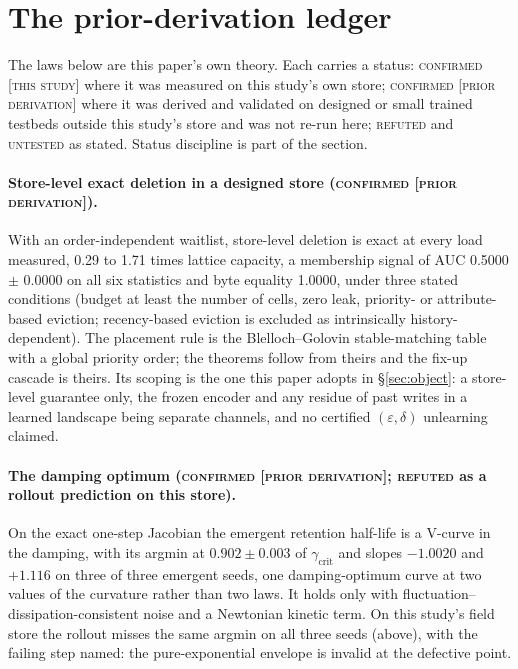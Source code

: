 \documentclass{article}
\begin{document}
\section{The prior-derivation ledger}
\label{app:shorts}

The laws below
are this paper's own theory. Each carries a status: \textsc{confirmed [this study]} where it was
measured on this study's own store; \textsc{confirmed [prior derivation]} where it was derived and
validated on designed or small trained testbeds outside this study's store and was not re-run
here; \textsc{refuted} and \textsc{untested} as stated. Status discipline is part of the section.


\paragraph{Store-level exact deletion in a designed store (\textsc{confirmed [prior
derivation]}).} With an order-independent waitlist, store-level deletion is exact at every load
measured, 0.29 to 1.71 times lattice capacity, a membership signal of AUC 0.5000 $\pm$ 0.0000 on all
six statistics and byte equality 1.0000, under three stated conditions (budget at least the number
of cells, zero leak, priority- or attribute-based eviction; recency-based eviction is excluded as
intrinsically history-dependent).
The placement rule is the Blelloch--Golovin stable-matching table with a global priority order;
the theorems follow from theirs and the fix-up cascade is theirs. Its scoping is the one this
paper adopts in \S\ref{sec:object}: a store-level guarantee only, the frozen encoder and any
residue of past writes in a learned landscape being separate channels, and no certified
$(\varepsilon,\delta)$ unlearning claimed.

\paragraph{The damping optimum (\textsc{confirmed [prior derivation]}; \textsc{refuted} as a
rollout prediction on this store).} On the exact one-step Jacobian the emergent retention
half-life is a V-curve in the damping, with its argmin at $0.902\pm0.003$ of
$\gamma_{\text{crit}}$ and slopes $-1.0020$ and $+1.116$ on three of three emergent seeds, one
damping-optimum curve at two values of the curvature rather than two laws.
It holds only with fluctuation--dissipation-consistent noise and a Newtonian kinetic term. On
this study's field store the rollout misses the same argmin on all three seeds (above), with the
failing step named: the pure-exponential envelope is invalid at the defective point.
\end{document}
